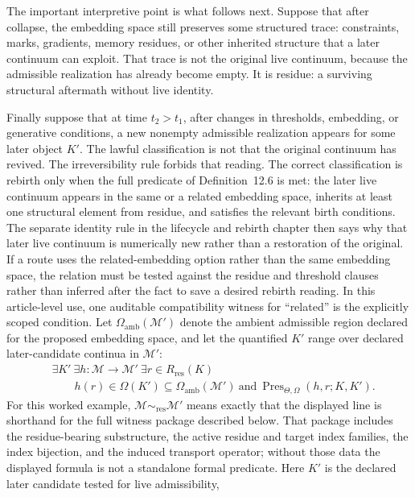 The important interpretive point is what follows next. Suppose that after collapse, the embedding
space still preserves some structured trace: constraints, marks, gradients, memory residues, or
other inherited structure that a later continuum can exploit. That trace is not the original live
continuum, because the admissible realization has already become empty. It is residue: a surviving
structural aftermath without live identity.

Finally suppose that at time \(t_2>t_1\), after changes in thresholds, embedding, or generative
conditions, a new nonempty admissible realization appears for some later object \(K'\). The
lawful classification is not that the original continuum has revived. The irreversibility rule
forbids that reading. The correct classification is rebirth only when the full predicate of
Definition~12.6 is met: the later live continuum appears in the same or a related
embedding space, inherits at least one structural element from residue, and satisfies the relevant
birth conditions. The separate identity rule in the lifecycle and rebirth chapter
then says why that later live continuum is numerically new rather than a
restoration of the original.
If a route uses the related-embedding option rather than the same embedding
space, the relation must be tested against the residue and threshold clauses
rather than inferred after the fact to save a desired rebirth reading. In this
article-level use, one auditable compatibility witness for ``related'' is the explicitly
scoped condition. Let \(\Omega_{\mathrm{amb}}(\mathcal{M}')\) denote the
ambient admissible region declared for the proposed embedding space, and let
the quantified \(K'\) range over declared later-candidate continua in
\(\mathcal{M}'\):
\[
  \begin{aligned}
  &\exists K'\ \exists h:\mathcal{M}\to\mathcal{M}'\ \exists r\in R_{\mathrm{res}}(K)\\
  &\qquad h(r)\in\Omega(K')\subseteq\Omega_{\mathrm{amb}}(\mathcal{M}')\ \text{and}\
  \operatorname{Pres}_{\Theta,\Omega}(h,r;K,K').
  \end{aligned}
\]
For this worked example,
\(\mathcal{M}\sim_{\mathrm{res}}\mathcal{M}'\) means exactly that the
displayed line is shorthand for the full witness package described below. That
package includes the residue-bearing substructure, the active residue and
target index families, the index bijection, and the induced transport
operator; without those data the displayed formula is not a standalone formal
predicate.
Here \(K'\) is the declared later candidate tested for live admissibility,
